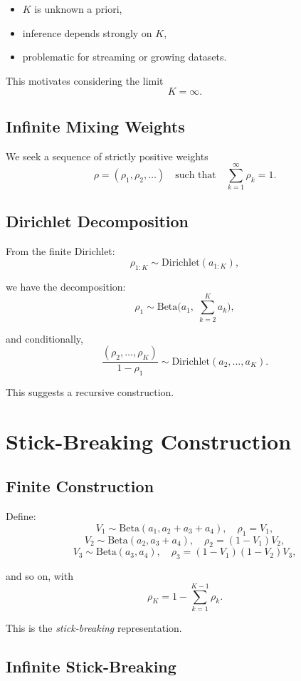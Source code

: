 \documentclass[12pt,oneside]{book}
\numberwithin{equation}{section}
\theoremstyle{definition}
\theoremstyle{plain}
\theoremstyle{remark}
\begin{document}
\begin{itemize}
\item $K$ is unknown a priori,
\item inference depends strongly on $K$,
\item problematic for streaming or growing datasets.
\end{itemize}

This motivates considering the limit
\[
K = \infty.
\]

\subsection*{Infinite Mixing Weights}

We seek a sequence of strictly positive weights
\[
\rho = (\rho_1, \rho_2, \ldots)
\quad \text{such that} \quad
\sum_{k=1}^\infty \rho_k = 1.
\]

\subsection*{Dirichlet Decomposition}

From the finite Dirichlet:
\[
\rho_{1:K} \sim \mathrm{Dirichlet}(a_{1:K}),
\]

we have the decomposition:
\[
\rho_1 \sim \mathrm{Beta}\Big(a_1,\; \sum_{k=2}^K a_k\Big),
\]

and conditionally,
\[
\frac{(\rho_2,\ldots,\rho_K)}{1 - \rho_1}
\sim \mathrm{Dirichlet}(a_2,\ldots,a_K).
\]

This suggests a recursive construction.

\section{Stick-Breaking Construction}

\subsection{Finite Construction}

Define:
\[
V_1 \sim \mathrm{Beta}(a_1, a_2 + a_3 + a_4), \quad \rho_1 = V_1,
\]
\[
V_2 \sim \mathrm{Beta}(a_2, a_3 + a_4), \quad \rho_2 = (1 - V_1)V_2,
\]
\[
V_3 \sim \mathrm{Beta}(a_3, a_4), \quad \rho_3 = (1 - V_1)(1 - V_2)V_3,
\]

and so on, with
\[
\rho_K = 1 - \sum_{k=1}^{K-1} \rho_k.
\]

This is the \emph{stick-breaking} representation.

\subsection{Infinite Stick-Breaking}
\end{document}

